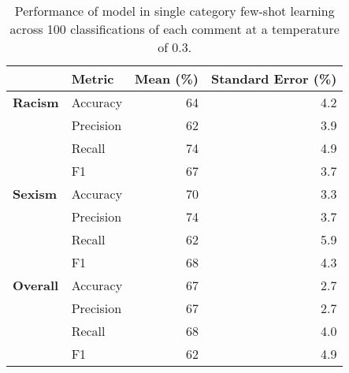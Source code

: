 \documentclass{bmcart}
\begin{document}
\begin{backmatter}
\begin{table}

\caption{\label{tab:fewshotsingle-summary}Performance of model in single category few-shot learning across 100 classifications of each comment at a temperature of 0.3.}
\centering
\begin{tabular}[t]{llrr}
\hline
 & Metric & Mean (\%) & Standard Error (\%)\\
\hline
\textbf{Racism} & Accuracy & 64 & 4.2\\
\textbf{} & Precision & 62 & 3.9\\
\textbf{} & Recall & 74 & 4.9\\
\textbf{} & F1 & 67 & 3.7\\
\textbf{Sexism} & Accuracy & 70 & 3.3\\
\textbf{} & Precision & 74 & 3.7\\
\textbf{} & Recall & 62 & 5.9\\
\textbf{} & F1 & 68 & 4.3\\
\textbf{Overall} & Accuracy & 67 & 2.7\\
\textbf{} & Precision & 67 & 2.7\\
\textbf{} & Recall & 68 & 4.0\\
\textbf{} & F1 & 62 & 4.9\\
\hline
\end{tabular}
\end{table}










\begin{table}


\end{table}
\end{backmatter}
\end{document}
